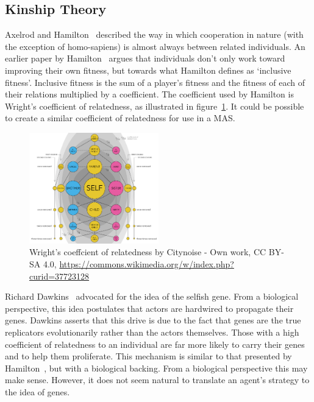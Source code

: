 \documentclass[]{final_report}
\begin{document}
\subsection{Kinship Theory}
\label{appendix:kin}
Axelrod and Hamilton~\cite{evolution_of_cooperation} described the way in which cooperation in nature (with the exception of homo-sapiens) is almost always between related individuals. An earlier paper by Hamilton~\cite{kinhamilton} argues that individuals don't only work toward improving their own fitness, but towards what Hamilton defines as `inclusive fitness'. Inclusive fitness is the sum of a player's fitness and the fitness of each of their relations multiplied by a coefficient. The coefficient used by Hamilton is Wright's coefficient of relatedness, as illustrated in figure~\ref{fig:coefrelate}. It could be possible to create a similar coefficient of relatedness for use in a MAS.
\begin{figure}
	\center
	\includegraphics[width=0.5\textwidth]{coefrelate.png}
	\caption{Wright's coeffcient of relatedness by Citynoise - Own work, CC BY-SA 4.0, \url{https://commons.wikimedia.org/w/index.php?curid=37723128}}
	\label{fig:coefrelate}
\end{figure}
\par
Richard Dawkins~\cite{selfish_gene} advocated for the idea of the selfish gene. From a biological perspective, this idea postulates that actors are hardwired to propagate their genes. Dawkins asserts that this drive is due to the fact that genes are the true replicators evolutionarily rather than the actors themselves. Those with a high coefficient of relatedness to an individual are far more likely to carry their genes and to help them proliferate. This mechanism is similar to that presented by Hamilton~\cite{kinhamilton}, but with a biological backing. From a biological perspective this may make sense. However, it does not seem natural to translate an agent's strategy to the idea of genes.\par
\end{document}
